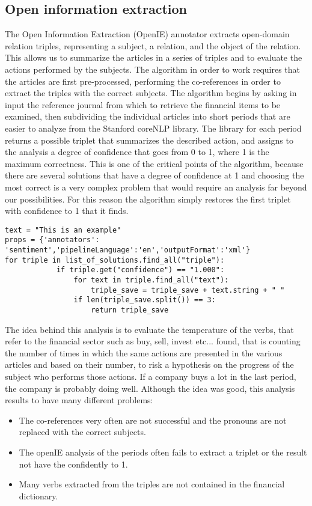 \subsection{Open information extraction}
The Open Information Extraction (OpenIE) annotator extracts open-domain relation triples, representing a subject, a relation, and the object of the relation. This allows us to summarize the articles in a series of triples and to evaluate the actions performed by the subjects. 
The algorithm in order to work requires that the articles are first pre-processed, performing the co-references in order to extract the triples with the correct subjects. 
The algorithm begins by asking in input the reference journal from which to retrieve the financial items to be examined, then subdividing the individual articles into short periods that are easier to analyze from the Stanford coreNLP library. The library for each period returns a possible triplet that summarizes the described action, and assigns to the analysis a degree of confidence that goes from 0 to 1, where 1 is the maximum correctness. This is one of the critical points of the algorithm, because there are several solutions that have a degree of confidence at 1 and choosing the most correct is a very complex problem that would require an analysis far beyond our possibilities. For this reason the algorithm simply restores the first triplet with confidence to 1 that it finds.
\begin{verbatim}
text = "This is an example"
props = {'annotators': 'sentiment','pipelineLanguage':'en','outputFormat':'xml'}
for triple in list_of_solutions.find_all("triple"):
            if triple.get("confidence") == "1.000":
                for text in triple.find_all("text"):
                    triple_save = triple_save + text.string + " "
                if len(triple_save.split()) == 3:
                    return triple_save
\end{verbatim}

The idea behind this analysis is to evaluate the temperature of the verbs, that refer to the financial sector such as buy, sell, invest etc... found, that is counting the number of times in which the same actions are presented in the various articles and based on their number, to risk a hypothesis on the progress of the subject who performs those actions. If a company buys a lot in the last period, the company is probably doing well.
Although the idea was good, this analysis results to have many different problems:
\begin{itemize}
\item
The co-references very often are not successful and the pronouns are not replaced with the correct subjects.
\item
The openIE analysis of the periods often fails to extract a triplet or the result not have the confidently to 1.
\item
Many verbs extracted from the triples are not contained in the financial dictionary.
\end{itemize}

